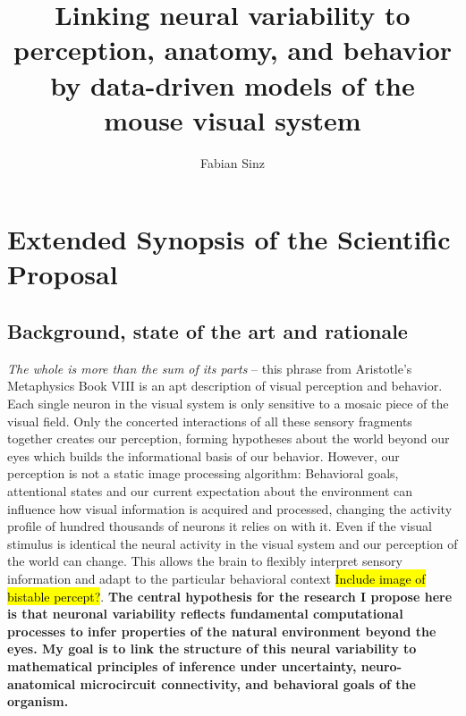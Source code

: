 \documentclass[COG,11pt]{ercgrant}
\author{Fabian Sinz}
\title{Linking neural variability to perception, anatomy, and behavior by data-driven models of the mouse visual system}
\begin{document}
\maketitle

\begin{abstract}
	\textcolor{red}{
		
	}
\end{abstract}



\section{Extended Synopsis of the Scientific Proposal}

\subsection{Background, state of the art and rationale}
\textit{The whole is more than the sum of its parts} -- this phrase from Aristotle's Metaphysics Book VIII is an apt description of visual perception and behavior. 
Each single neuron in the visual system is only sensitive to a mosaic piece of the visual field. Only the concerted interactions of all these sensory fragments together creates our perception, forming hypotheses about the world beyond our eyes which builds the informational basis of our behavior. 
However, our perception is not a static image processing algorithm: Behavioral goals, attentional states and our current expectation about the environment can influence how visual information is acquired and processed, changing the activity profile of hundred thousands of neurons it relies on with it. 
Even if the visual stimulus is identical the neural activity in the visual system and our perception of the world can change. This allows the brain to flexibly interpret sensory information and adapt to the particular behavioral context \hl{Include image of bistable percept?}.  
\textbf{The central hypothesis for the research I propose here is that  neuronal variability reflects fundamental computational processes to infer properties of the natural environment beyond the eyes. My goal is to link the structure of this neural variability to mathematical principles of inference under uncertainty, neuro-anatomical microcircuit connectivity, and behavioral goals of the organism.} 
\end{document}
